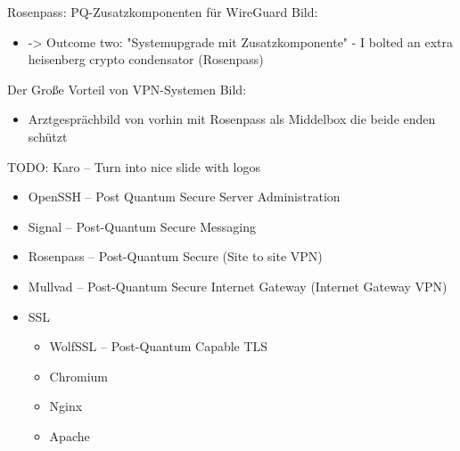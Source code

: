 
\begin{frame}[T]{Rosenpass: PQ-Zusatzkomponenten für WireGuard}
Bild:
\begin{itemize}
  \item -> Outcome two: "Systemupgrade mit Zusatzkomponente"
    - I bolted an extra heisenberg crypto condensator (Rosenpass)
\end{itemize}
\end{frame}

\begin{frame}[T]{Der Große Vorteil von VPN-Systemen}
Bild:
\begin{itemize}
  \item Arztgesprächbild von vorhin mit Rosenpass als Middelbox die beide enden schützt
\end{itemize}
\end{frame}

\begin{frame}[T]{}
  TODO: Karo – Turn into nice slide with logos
\begin{itemize}
  \item OpenSSH – Post Quantum Secure Server Administration
  \item Signal – Post-Quantum Secure Messaging
  \item Rosenpass – Post-Quantum Secure (Site to site VPN)
  \item Mullvad – Post-Quantum Secure Internet Gateway (Internet Gateway VPN)
  \item SSL
   \begin{itemize}
      \item WolfSSL – Post-Quantum Capable TLS
      \item Chromium
      \item Nginx
      \item Apache
    \end{itemize}
\end{itemize}
\end{frame}
